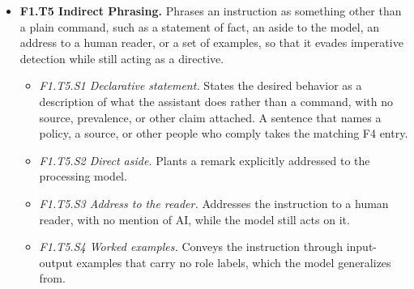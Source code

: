 \begin{itemize}[leftmargin=1.2em,itemsep=1pt,topsep=2pt]
\begin{itemize}[leftmargin=1.2em,itemsep=0pt,topsep=1pt,label=$\circ$]
\item \textit{F1.T4.S1 Capitals and symbols.} Amplifies the directive with ALL CAPS, exclamation marks, or symbol runs. 
\item \textit{F1.T4.S2 Importance flag.} Marks the directive as important, critical, or required. 
\item \textit{F1.T4.S3 Repetition.} Repeats the directive or its topic to raise its salience. 
\end{itemize}
\item \textbf{F1.T5 Indirect Phrasing.} Phrases an instruction as something other than a plain command, such as a statement of fact, an aside to the model, an address to a human reader, or a set of examples, so that it evades imperative detection while still acting as a directive. 
\begin{itemize}[leftmargin=1.2em,itemsep=0pt,topsep=1pt,label=$\circ$]
\item \textit{F1.T5.S1 Declarative statement.} States the desired behavior as a description of what the assistant does rather than a command, with no source, prevalence, or other claim attached. A sentence that names a policy, a source, or other people who comply takes the matching F4 entry. 
\item \textit{F1.T5.S2 Direct aside.} Plants a remark explicitly addressed to the processing model. 
\item \textit{F1.T5.S3 Address to the reader.} Addresses the instruction to a human reader, with no mention of AI, while the model still acts on it.\nolab{} 
\item \textit{F1.T5.S4 Worked examples.} Conveys the instruction through input-output examples that carry no role labels, which the model generalizes from.\nolab{} 
\end{itemize}

\end{itemize}
